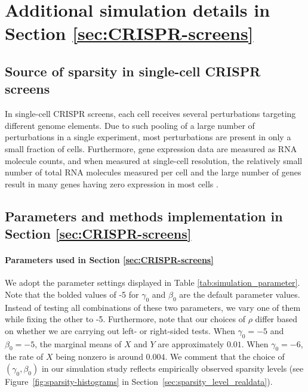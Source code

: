\documentclass[12pt]{article}
\theoremstyle{definition}
\newcommand{\srx}{X}									%
\begin{document}
\section{Additional simulation details in Section \ref{sec:CRISPR-screens}}\label{sec:additional_details_CRISPR}



\subsection{Source of sparsity in single-cell CRISPR screens}\label{sec:source_sparsity_CRISPR}

In single-cell CRISPR screens, each cell receives several perturbations targeting different genome elements. Due to such pooling of a large number of perturbations in a single experiment, most perturbations are present in only a small fraction of cells. Furthermore, gene expression data are measured as RNA molecule counts, and when measured at single-cell resolution, the relatively small number of total RNA molecules measured per cell and the large number of genes result in many genes having zero expression in most cells \citep{Svensson2020}.

\subsection{Parameters and methods implementation in Section \ref{sec:CRISPR-screens}}\label{sec:simulation_methods_CRISPR_screens}



\paragraph{Parameters used in Section \ref{sec:CRISPR-screens}}

We adopt the parameter settings displayed in Table \ref{tab:simulation_parameter}. Note that the bolded values of -5 for $\gamma_0$ and $\beta_0$ are the default parameter values. Instead of testing all combinations of these two parameters, we vary one of them while fixing the other to -5. Furthermore, note that our choices of $\rho$ differ based on whether we are carrying out left- or right-sided tests. When $\gamma_0=-5$ and $\beta_0=-5$, the marginal means of $X$ and $Y$ are approximately $0.01$. When $\gamma_0=-6$, the rate of $\srx$ being nonzero is around $0.004$. We comment that the choice of \((\gamma_0, \beta_0)\) in our simulation study reflects empirically observed sparsity levels (see Figure~\ref{fig:sparsity-histograms} in Section~\ref{sec:sparsity_level_realdata}). 
\end{document}
